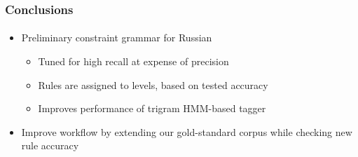 \documentclass{beamer}
\begin{document}
\begin{frame}
\frametitle{Conclusions}
\framesubtitle{}
\begin{itemize}
	\item Preliminary constraint grammar for Russian
	\pause
	\begin{itemize}
		\item Tuned for high recall at expense of precision
		\pause
		\item Rules are assigned to levels, based on tested accuracy
		\pause
		\item Improves performance of trigram HMM-based tagger
		\pause
	\end{itemize}
	\item Improve workflow by extending our gold-standard corpus while checking new rule accuracy
\end{itemize}
\end{frame}


\begin{tiny}

\end{tiny}
\end{document}
